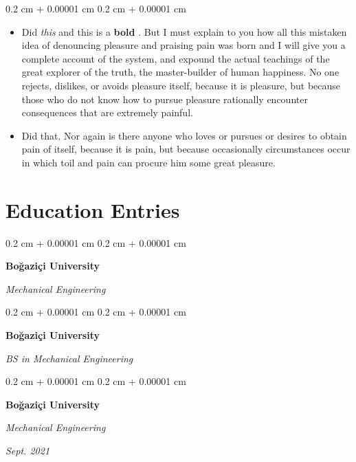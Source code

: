 \documentclass[10pt, letterpaper]{article}
\newenvironment{highlights}{
    \begin{itemize}[
        topsep=0.10 cm,
        parsep=0.10 cm,
        partopsep=0pt,
        itemsep=0pt,
        leftmargin=0.4 cm + 10pt
    ]
}{
    \end{itemize}
} %
\newenvironment{onecolentry}{
    \begin{adjustwidth}{
        0.2 cm + 0.00001 cm
    }{
        0.2 cm + 0.00001 cm
    }
}{
    \end{adjustwidth}
} %
\newenvironment{twocolentry}[2][]{
    \onecolentry
    \def\secondColumn{#2}
    \setcolumnwidth{\fill, 4.5 cm}
    \begin{paracol}{2}
}{
    \switchcolumn \raggedleft \secondColumn
    \end{paracol}
    \endonecolentry
} %
\let\hrefWithoutArrow\href
\renewcommand{\href}[2]{\hrefWithoutArrow{#1}{\mbox{\ifthenelse{\equal{#2}{}}{ }{#2 }\raisebox{.15ex}{\footnotesize \faExternalLink*}}}}
\begin{document}
        \vspace{0.10 cm-3px}
        \begin{onecolentry}
            \begin{highlights}
                \item Did \textit{this} and this is a \textbf{bold} \href{https://example.com}{link}. But I must explain to you how all this mistaken idea of denouncing pleasure and praising pain was born and I will give you a complete account of the system, and expound the actual teachings of the great explorer of the truth, the master-builder of human happiness. No one rejects, dislikes, or avoids pleasure itself, because it is pleasure, but because those who do not know how to pursue pleasure rationally encounter consequences that are extremely painful.
                \item Did that. Nor again is there anyone who loves or pursues or desires to obtain pain of itself, because it is pain, but because occasionally circumstances occur in which toil and pain can procure him some great pleasure.
            \end{highlights}
        \end{onecolentry}



    
    \section{Education Entries}



        
        \begin{onecolentry}
            \textbf{Boğaziçi University}

            \textit{Mechanical Engineering}
        \end{onecolentry}



        \vspace{0.2 cm-3px}

        \begin{onecolentry}
            \textbf{Boğaziçi University}

            \textit{BS in Mechanical Engineering}
        \end{onecolentry}



        \vspace{0.2 cm-3px}

        \begin{twocolentry}{
            
            
        \textit{Sept. 2021}}
            \textbf{Boğaziçi University}

            \textit{Mechanical Engineering}
        \end{twocolentry}
\end{document}
